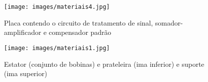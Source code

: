 \begin{figure}[H]
\centering
\texttt{[image: images/materiais4.jpg]}
\caption{Placa contendo o circuito de tratamento de sinal, somador-amplificador e compensador padrão}
\label{fig:atuadorcirc}
\end{figure}

\begin{figure}[H]
\centering
\texttt{[image: images/materiais1.jpg]}
\caption{Estator (conjunto de bobinas) e prateleira (ima inferior) e suporte (ima superior)}
\label{fig:materiais-placa1}
\end{figure}
